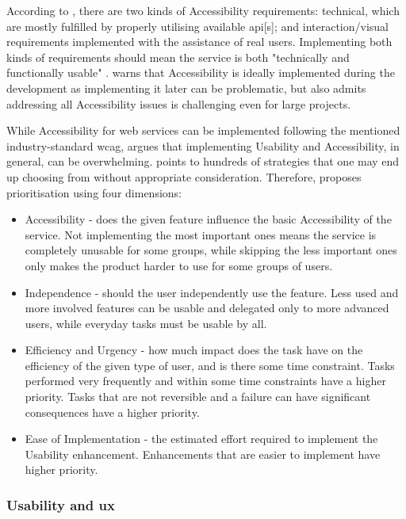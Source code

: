 \label{Kinds-of-Accessibility}
According to \textcite{WAI_Topics}, there are two kinds of Accessibility requirements: technical, which are mostly fulfilled by properly utilising available \gls{api}[s]; and interaction/visual requirements implemented with the assistance of real users.
Implementing both kinds of requirements should mean the service is both "technically and functionally usable" \parencite{WAI_Topics}.
\textcite{WAI_Topics} warns that Accessibility is ideally implemented during the development as implementing it later can be problematic, but also admits addressing all Accessibility issues is challenging even for large projects.

While Accessibility for web services can be implemented following the mentioned industry-standard \gls{wcag}, \textcite{Vanderheiden_2000} argues that implementing Usability and Accessibility, in general, can be overwhelming.
\textcite{Vanderheiden_2000} points to hundreds of strategies that one may end up choosing from without appropriate consideration.
Therefore, \textcite{Vanderheiden_2000} proposes prioritisation using four dimensions:

\begin{itemize}
    \item Accessibility - does the given feature influence the basic Accessibility of the service. Not implementing the most important ones means the service is completely unusable for some groups, while skipping the less important ones only makes the product harder to use for some groups of users.
    \item Independence - should the user independently use the feature. Less used and more involved features can be usable and delegated only to more advanced users, while everyday tasks must be usable by all.
    \item Efficiency and Urgency - how much impact does the task have on the efficiency of the given type of user, and is there some time constraint. Tasks performed very frequently and within some time constraints have a higher priority. Tasks that are not reversible and a failure can have significant consequences have a higher priority.
    \item Ease of Implementation - the estimated effort required to implement the Usability enhancement. Enhancements that are easier to implement have higher priority.
\end{itemize}

\subsubsection{Usability and \gls{ux}}

